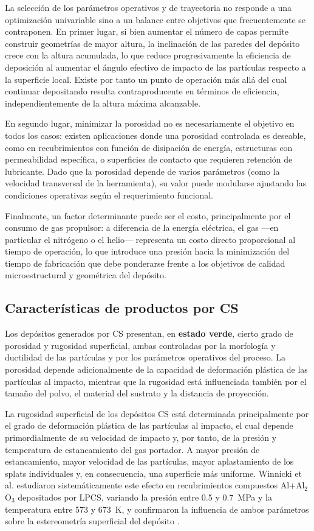 La selección de los parámetros operativos y de trayectoria no responde a una optimización univariable sino a un balance entre objetivos que frecuentemente se contraponen. En primer lugar, si bien aumentar el número de capas permite construir geometrías de mayor altura, la inclinación de las paredes del depósito crece con la altura acumulada, lo que reduce progresivamente la eficiencia de deposición al aumentar el ángulo efectivo de impacto de las partículas respecto a la superficie local. Existe por tanto un punto de operación más allá del cual continuar depositando resulta contraproducente en términos de eficiencia, independientemente de la altura máxima alcanzable.

 En segundo lugar, minimizar la porosidad no es necesariamente el objetivo en todos los casos: existen aplicaciones donde una porosidad controlada es deseable, como en recubrimientos con función de disipación de energía, estructuras con permeabilidad específica, o superficies de contacto que requieren retención de lubricante. Dado que la porosidad depende de varios parámetros (como la velocidad transversal de la herramienta), su valor puede modularse ajustando las condiciones operativas según el requerimiento funcional. 
 
 Finalmente, un factor determinante puede ser el costo, principalmente por el consumo de gas propulsor: a diferencia de la energía eléctrica, el gas —en particular el nitrógeno o el helio— representa un costo directo proporcional al tiempo de operación, lo que introduce una presión hacia la minimización del tiempo de fabricación que debe ponderarse frente a los objetivos de calidad microestructural y geométrica del depósito.

\subsection{Características de productos por CS}

Los depósitos generados por CS presentan, en \textbf{estado verde}, cierto grado de porosidad y rugosidad superficial, ambas controladas por la morfología y ductilidad de las partículas y por los parámetros operativos del proceso. La porosidad depende adicionalmente de la capacidad de deformación plástica de las partículas al impacto, mientras que la rugosidad está influenciada también por el tamaño del polvo, el material del sustrato y la distancia de proyección.

La rugosidad superficial de los depósitos CS está determinada principalmente
por el grado de deformación plástica de las partículas al impacto, el cual
depende primordialmente de su velocidad de impacto y, por tanto, de la presión y temperatura
de estancamiento del gas portador. A mayor
presión de estancamiento, mayor velocidad de las partículas, mayor
aplastamiento de los splats individuales y, en consecuencia, una superficie
más uniforme. Winnicki et al. estudiaron sistemáticamente
este efecto en recubrimientos compuestos Al+Al$_2$O$_3$ depositados por LPCS,
variando la presión entre 0.5 y 0.7~MPa y la temperatura entre 573 y 673~K,
y confirmaron la influencia de ambos parámetros sobre la estereometría
superficial del depósito \cite{Winnicki2014stereometry}.

